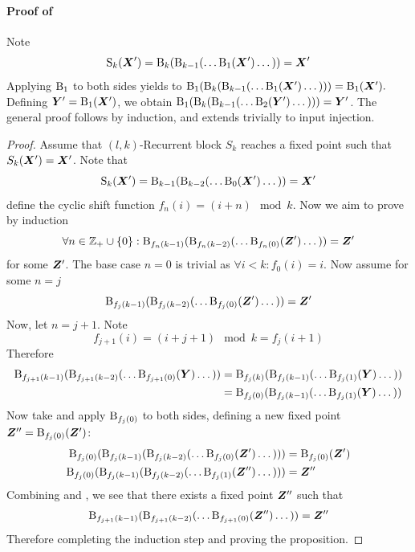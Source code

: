 \paragraph{Proof of }

\begin{sketch}
    Note
    $$\operatorname{S}_k({\bm{X}}') = \operatorname{B}_k(\operatorname{B}_{k-1}( \dots \operatorname{B}_1({\bm{X}}') \dots )) = {\bm{X}}'$$
    Applying $\operatorname{B}_1$ to both sides yields to
    $\operatorname{B}_1(\operatorname{B}_k(\operatorname{B}_{k-1}( \dots \operatorname{B}_1(\\{\bm{X}}') \dots ))) = \operatorname{B}_1({\bm{X}}').$
    Defining ${\bm{Y}}' = \operatorname{B}_1({\bm{X}}')$, we obtain
    $\operatorname{B}_1(\operatorname{B}_k(\operatorname{B}_{k-1}( \dots \operatorname{B}_2({\bm{Y}}') \dots ))) = {\bm{Y}}'$. 
    The general proof follows by induction, and extends trivially to input injection.   
\end{sketch}

\begin{proof}
    Assume that $(l,k)$-Recurrent block $S_k$ reaches a fixed point such that $S_k({\bm{X}}') = {\bm{X}}'$. Note that
    $$\operatorname{S}_k({\bm{X}}') = \operatorname{B}_{k-1}(\operatorname{B}_{k-2}( \dots \operatorname{B}_0({\bm{X}}') \dots )) = {\bm{X}}'$$
    define the cyclic shift function $f_n(i) = (i + n) \mod k$. Now we aim to prove by induction
    $$\forall n \in \mathbb{Z}_+ \cup \{0\} : \operatorname{B}_{f_n(k-1)}(\operatorname{B}_{f_n(k-2)}( \dots \operatorname{B}_{f_n(0)}({\bm{Z}}') \dots )) = {\bm{Z}}'$$
    for some ${\bm{Z}}'$. The base case $n=0$ is trivial as $\forall i < k: f_0(i) = i$.
    Now assume for some $n=j$
    \begin{equation}\label{eq:ind_hyp}
        \operatorname{B}_{f_j(k-1)}(\operatorname{B}_{f_j(k-2)}( \dots \operatorname{B}_{f_j(0)}({\bm{Z}}') \dots )) = {\bm{Z}}'
    \end{equation}
    Now, let $n=j+1$. Note 
    $$f_{j+1}(i) = (i + j + 1) \mod k = f_{j}(i + 1)$$
    Therefore
    \begin{align}
        \operatorname{B}_{f_{j+1}(k-1)}(\operatorname{B}_{f_{j+1}(k-2)}( \dots \operatorname{B}_{f_{j+1}(0)}({\bm{Y}}) \dots )) &= \operatorname{B}_{f_j(k)}(\operatorname{B}_{f_j(k-1)}( \dots \operatorname{B}_{f_j(1)}({\bm{Y}}) \dots )) \\
        &= \operatorname{B}_{f_j(0)}(\operatorname{B}_{f_j(k-1)}( \dots \operatorname{B}_{f_j(1)}({\bm{Y}}) \dots ))  \label{eq:cycle_applied}
    \end{align}
     Now take  and apply $\operatorname{B}_{f_j(0)}$ to both sides, defining a new fixed point ${\bm{Z}}^{\prime \prime} = \operatorname{B}_{f_j(0)}({\bm{Z}}')$:
     \begin{align}
         \operatorname{B}_{f_j(0)}(\operatorname{B}_{f_j(k-1)}(\operatorname{B}_{f_j(k-2)}( \dots \operatorname{B}_{f_j(0)}({\bm{Z}}') \dots ))) &= \operatorname{B}_{f_j(0)}({\bm{Z}}') \\
         \operatorname{B}_{f_j(0)}(\operatorname{B}_{f_j(k-1)}(\operatorname{B}_{f_j(k-2)}( \dots \operatorname{B}_{f_j(1)}({\bm{Z}}^{\prime \prime}) \dots ))) &= {\bm{Z}}^{\prime \prime} \label{eq:new_fixed_point}
     \end{align}
     Combining  and , we see that there exists a fixed point ${\bm{Z}}^{\prime \prime}$ such that
     $$\operatorname{B}_{f_{j+1}(k-1)}(\operatorname{B}_{f_{j+1}(k-2)}( \dots \operatorname{B}_{f_{j+1}(0)}({\bm{Z}}^{\prime \prime}) \dots )) = {\bm{Z}}^{\prime \prime}$$
     Therefore completing the induction step and proving the proposition.
\end{proof}

